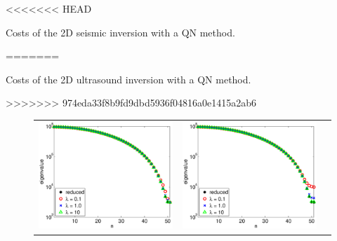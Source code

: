\documentclass{iopart}
\begin{document}
{\begin{table}
\centering

<<<<<<< HEAD
\caption{Costs of the 2D seismic inversion with a QN method.}
=======
\caption{Costs of the 2D ultrasound inversion with a QN method.}
>>>>>>> 974eda33f8b9fd9dbd5936f04816a0e1415a2ab6
\label{table:2D_exp2}
\end{table}
\clearpage

\begin{figure}
\centering
\begin{tabular}{ccc}
\includegraphics[scale=.2]{./figs/example2_a}&
\includegraphics[scale=.2]{./figs/example2_b}&

\end{tabular}
\end{figure}}
\end{document}
